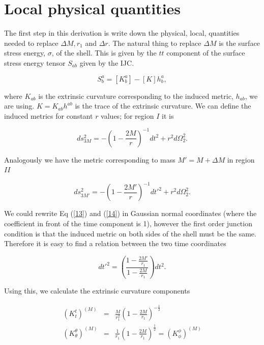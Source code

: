 \documentclass[aps,showpacs,onecolumn,floats,prd,superscriptaddress,nofootinbib]{revtex4-1}
\begin{document}
\section{Local physical quantities}
\label{finalEq}

The first step in this derivation is write down the physical, local, quantities needed to replace $\Delta M, r_1$ and $\Delta r$. The natural thing to replace $\Delta M$ is the surface stress energy, $\sigma$, of the shell. This is given by the $tt$ component of the surface stress energy tensor $S_{ab}$ given by the IJC.

\begin{equation}
	S^a_b = [K^a_b] - [K]h^a_b,
\end{equation}

where $K_{ab}$ is the extrinsic curvature corresponding to the induced metric, $h_{ab}$, we are using. $K = K_{ab} h^{ab}$ is the trace of the extrinsic curvature.
We can define the induced metrics for constant $r$ values; for region $I$ it is 

\begin{equation}
	ds_{3M}^2 = - \left( 1 - \frac{2M}{r} \right)^{-1} dt^2 + r^2 d \Omega_2^2.	\label{13}
\end{equation}

Analogously we have the metric corresponding to mass $M' = M+ \Delta M$ in region $II$

\begin{equation}
	ds_{3M'}^2 = - \left( 1 - \frac{2M'}{r} \right)^{-1} dt'^2 + r^2 d \Omega_2^2.	\label{14}
\end{equation}

We could rewrite Eq (\ref{13}) and (\ref{14}) in Gaussian normal coordinates (where the coefficient in front of the time component is 1), however the first order junction condition is that the induced metric on both sides of the shell must be the same. Therefore it is easy to find a relation between the two time coordinates

\begin{equation}
	dt'^2 = \left( \frac{1 - \frac{2M'}{r_1}}{ 1- \frac{2M}{r_1}} \right) dt^2.
\end{equation}

Using this, we calculate the extrinsic curvature components

\begin{eqnarray}
	(K^t_t)^{(M)} & = & \frac{M}{r_1^2} \left( 1 - \frac{2M}{r_1} \right)^{-\frac{1}{2}} 	\nonumber	\\
	(K^\theta_\theta)^{(M)} & = & \frac{1}{r_1} \left( 1 - \frac{2M}{r_1} \right)^\frac{1}{2} 
	= (K^\phi_\phi)^{(M)}	\label{16}
\end{eqnarray}
\end{document}
